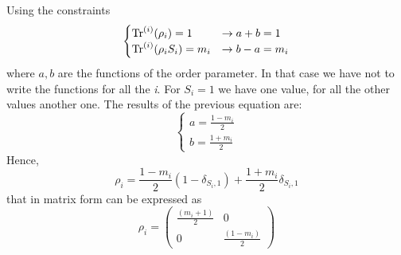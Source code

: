 \documentclass[../main/main.tex]{subfiles}
\begin{document}
Using the constraints
\begin{equation*}
  \begin{cases}
    \Tr^{(i)}(\rho _i) = 1  &\rightarrow  a+b=1\\
    \Tr^{(i)}(\rho _i S_i) = m_i  & \rightarrow b-a = m_i
  \end{cases}
\end{equation*}
where \( a,b \) are the functions of the order parameter.
In that case we have not to write the functions for all the \emph{i}. For \( S_i = 1 \) we have one value, for all the other values another one.
The results of the previous equation are:
\begin{equation*}
  \begin{cases}
   a = \frac{1-m_i}{2} \\
   b = \frac{1+m_i}{2}
  \end{cases}
\end{equation*}
Hence,
\begin{equation}
  \rho _i =   \frac{1-m_i}{2}  (1- \delta _{S_i,1}) + \frac{1+m_i}{2} \delta _{S_i,1}
\end{equation}
that in matrix form can be expressed as
\begin{equation}
\rho_i = 
\begin{pmatrix}
\frac{(m_i+1)}{2}   & 0 \\
  0 &    \frac{(1-m_i)}{2}
\end{pmatrix}
\end{equation}
\end{document}
